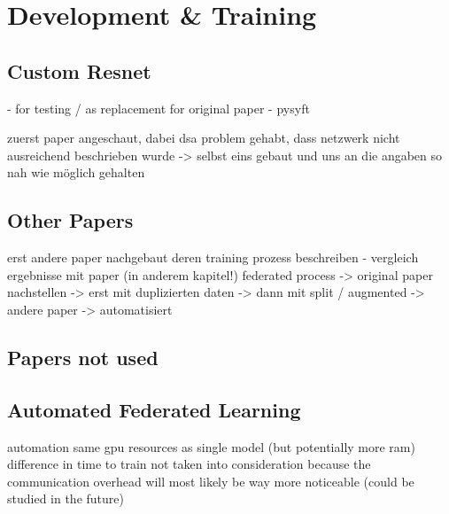 \section{Development \& Training}

\subsection{Custom Resnet}
- for testing / as replacement for original paper
- pysyft

zuerst paper angeschaut, dabei dsa problem gehabt, dass netzwerk nicht ausreichend beschrieben wurde
-> selbst eins gebaut und uns an die angaben so nah wie möglich gehalten


\subsection{Other Papers}
erst andere paper nachgebaut
deren training prozess beschreiben - vergleich ergebnisse mit paper (in anderem kapitel!)
federated process 
  -> original paper nachstellen
  -> erst mit duplizierten daten
  -> dann mit split / augmented
  -> andere paper
  -> automatisiert


\subsection{Papers not used}


\subsection{Automated Federated Learning}
automation
same gpu resources as single model (but potentially more ram)
difference in time to train not taken into consideration because the communication overhead will most likely be way more noticeable (could be studied in the future)
